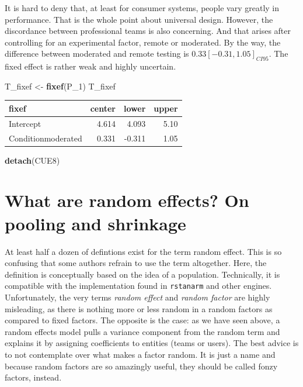 \documentclass[]{svmono}
\newenvironment{Shaded}{\begin{snugshade}}{\end{snugshade}}
\newcommand{\KeywordTok}[1]{\textcolor[rgb]{0.13,0.29,0.53}{\textbf{#1}}}
\newcommand{\DecValTok}[1]{\textcolor[rgb]{0.00,0.00,0.81}{#1}}
\newcommand{\StringTok}[1]{\textcolor[rgb]{0.31,0.60,0.02}{#1}}
\newcommand{\NormalTok}[1]{#1}
\begin{document}
It is hard to deny that, at least for consumer systems, people vary
greatly in performance. That is the whole point about universal design.
However, the discordance between professional teams is also concerning.
And that arises after controlling for an experimental factor, remote or
moderated. By the way, the difference between moderated and remote
testing is \(0.33 [-0.31, 1.05]_{CI95}\). The fixed effect is rather
weak and highly uncertain.

\begin{Shaded}
\begin{Highlighting}[]
\NormalTok{T_fixef <-}\StringTok{ }\KeywordTok{fixef}\NormalTok{(P_}\DecValTok{1}\NormalTok{)}
\NormalTok{T_fixef}
\end{Highlighting}
\end{Shaded}

\begin{longtable}[]{@{}lrrr@{}}
\toprule
fixef & center & lower & upper\tabularnewline
\midrule
\endhead
Intercept & 4.614 & 4.093 & 5.10\tabularnewline
Conditionmoderated & 0.331 & -0.311 & 1.05\tabularnewline
\bottomrule
\end{longtable}

\begin{Shaded}
\begin{Highlighting}[]
\KeywordTok{detach}\NormalTok{(CUE8)}
\end{Highlighting}
\end{Shaded}

\section{What are random effects? On pooling and
shrinkage}\label{what-are-random-effects-on-pooling-and-shrinkage}

At least half a dozen of defintions exist for the term random effect.
This is so confusing that some authors refrain to use the term
altogether. Here, the definition is conceptually based on the idea of a
population. Technically, it is compatible with the implementation found
in \texttt{rstanarm} and other engines. Unfortunately, the very terms
\emph{random effect} and \emph{random factor} are highly misleading, as
there is nothing more or less random in a random factors as compared to
fixed factors. The opposite is the case: as we have seen above, a random
effects model pulls a variance component from the random term and
explains it by assigning coefficients to entities (teams or users). The
best advice is to not contemplate over what makes a factor random. It is
just a name and because random factors are so amazingly useful, they
should be called fonzy factors, instead.
\end{document}
